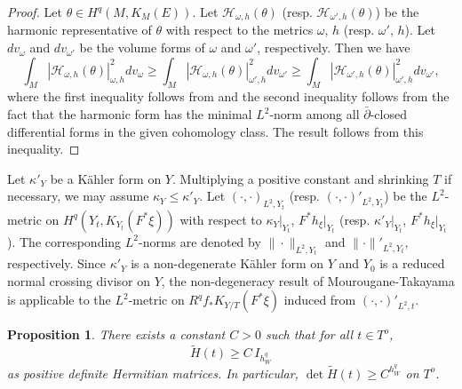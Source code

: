 \documentclass[amscd, leqno]{amsart}
\theoremstyle{plain}
\newtheorem{proposition}[theorem]{Proposition}
\theoremstyle{definition}
\theoremstyle{remark}
\newenvironment{pf}{\begin{proof}}{\end{proof}}
\begin{document}
\begin{pf}
Let $\theta \in H^{q}(M, K_{M}(E))$. Let ${\mathcal H}_{\omega,h}(\theta)$ (resp. ${\mathcal H}_{\omega',h}(\theta)$) 
be the harmonic representative of $\theta$ with respect to the metrics $\omega$, $h$ (resp. $\omega'$, $h$). 
Let $dv_{\omega}$ and $dv_{\omega'}$ be the volume forms of $\omega$ and $\omega'$, respectively. Then we have
$$
\int_{M} | {\mathcal H}_{\omega,h}(\theta) |_{\omega,h}^{2} dv_{\omega}
\geq 
\int_{M} | {\mathcal H}_{\omega,h}(\theta) |_{\omega',h}^{2} dv_{\omega'}
\geq
\int_{M} | {\mathcal H}_{\omega',h}(\theta) |_{\omega',h}^{2} dv_{\omega'},
$$
where the first inequality follows from \cite[Chap.VIII, Lemma~6.3]{Demailly12} and the second inequality follows from the fact 
that the harmonic form has the minimal $L^{2}$-norm among all $\bar{\partial}$-closed differential forms in the given cohomology class.
The result follows from this inequality.
\end{pf}


Let $\kappa'_{Y}$ be a K\"ahler form on $Y$. Multiplying a positive constant and shrinking $T$ if necessary, we may assume
$\kappa_{Y} \leq \kappa'_{Y}$. Let $( \cdot, \cdot)_{L^{2}, Y_{t}}$ (resp. $( \cdot, \cdot)'_{L^{2}, Y_{t}}$) be the $L^{2}$-metric on
$H^{q}(Y_{t}, K_{Y_{t}}(F^{*}\xi))$ with respect to $\kappa_{Y}|_{Y_{t}}$, $F^{*}h_{\xi}|_{Y_{t}}$ 
(resp. $\kappa'_{Y}|_{Y_{t}}$, $F^{*}h_{\xi}|_{Y_{t}}$).
The corresponding $L^{2}$-norms are denoted by $\| \cdot \|_{L^{2},Y_{t}}$ and $\| \cdot \|'_{L^{2},Y_{t}}$, respectively.
Since $\kappa'_{Y}$ is a non-degenerate K\"ahler form on $Y$ and $Y_{0}$ is a  reduced normal crossing divisor on $Y$, 
the non-degeneracy result of Mourougane-Takayama \cite[Lemmas~4.7, 4.8]{MourouganeTakayama09} is applicable to
the $L^{2}$-metric on $R^{q}f_{*}K_{Y/T}(F^{*}\xi)$ induced from $(\cdot,\cdot)'_{L^{2},t}$.


\begin{proposition}
\label{prop:nonvanishing} 
There exists a constant $C>0$ such that for all $t \in T^{o}$,
\begin{equation}
\label{eqn:nonvanishing:0}
\widetilde{H}(t) \geq C\, I_{h_{W}^{q}}
\end{equation}
as positive definite Hermitian matrices.
In particular, $\det \widetilde{H}(t)\geq C^{h_{W}^{q}}$ on $T^{o}$.
\end{proposition}
\end{document}
